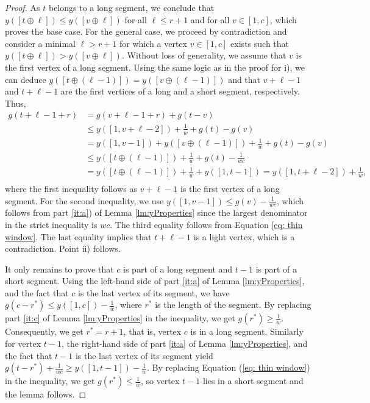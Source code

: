 \documentclass[11pt]{article}
\newcommand\+{\mkern2mu}
\begin{document}
\begin{proof}
    As $t$ belongs to a long segment, we conclude that $y([t\oplus \ell]) \le y([v\oplus \ell])$ for all $\ell \leq r+1$ and for all $v\in [1,c]$, which proves the base case. For the general case, we proceed by contradiction and consider a minimal $\ell > r+1$ for which a vertex $v\in[1,c]$ exists such that $y([t\oplus \ell])> y([v\oplus \ell])$. Without loss of generality, we assume that $v$ is the first vertex of a long segment. Using the same logic as in the proof for i), we can deduce $y([t\oplus( \ell-1)]) = y([v\oplus (\ell-1)])$ and that $v+\ell-1$ and $t+\ell-1$ are the first vertices of a long and a short segment, respectively. Thus, 
    \begin{align*}\label{eq:ine1toell}
    g(t + \ell -1 + r) &= g(v +\ell - 1 +r) + g(t-v) \\
    &\le y([1, v + \ell- 2]) + \frac{1}{w} + g(t)-g(v) \\ 
    &= y([1,v-1]) + y([v\oplus (\ell-1)]) + \frac{1}{w} + g(t) - g(v) \\ 
    &\leq y([t \oplus (\ell-1)]) + \frac{1}{w} + g(t) - \frac{1}{wc} \\
    &=  y([t \oplus (\ell-1)]) + \frac{1}{w} + y([1, t-1])  = y([1, t + \ell - 2]) + \frac{1}{w},\\
    \end{align*}
    where the first inequality follows as $v + \ell - 1$ is the first vertex of a long segment. For the second inequality, we use $y([1, v-1]) \leq g(v) - \frac{1}{wc}$, which follows from part \ref{it:a}) of Lemma \ref{lm:yProperties}  since the largest denominator in the strict inequality is $wc$. The third equality follows from Equation \ref{eq: thin window}. The last equality implies that $t + \ell - 1$ is a light vertex, which is a contradiction. Point ii) follows.

    It only remains to prove that $c$ is part of a long segment and $t-1$ is part of a short segment. Using the left-hand side of part \ref{it:a} of Lemma \ref{lm:yProperties}, and the fact that $c$ is the last vertex of its segment, we have $g(c-r^*) \leq y([1, c]) - \frac{1}{w}$, where $r^*$ is the length of the segment. By replacing part \ref{it:c} of Lemma \ref{lm:yProperties} in the inequality, we get $g(r^*) \geq \frac{1}{w}$. Consequently, we get $r^*=r+1$, that is, vertex $c$ is in a long segment. Similarly for vertex $t-1$, the right-hand side of part \ref{it:a} of Lemma \ref{lm:yProperties}, and the fact that $t-1$ is the last vertex of its segment yield $g(t - r^*) + \frac{1}{wc} \geq y([1, t-1]) - \frac{1}{w}$. By replacing Equation (\ref{eq: thin window}) in the inequality, we get $g(r^*) \leq \frac{1}{w}$, so vertex $t-1$ lies in a short segment and the lemma follows.
\end{proof}
\end{document}
